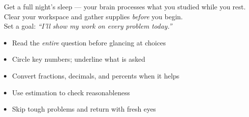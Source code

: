 {\vspace{3mm}

\begin{tcolorbox}[
    enhanced,
    colback=funBlueDark!5,
    colframe=funBlueDark!40,
    arc=8pt, boxrule=1pt,
    left=5mm, right=5mm, top=3mm, bottom=3mm,
    title={\small\faMoon~Pre-Launch Checklist},
    colbacktitle=funBlueDark!15,
    coltitle=black,
    fonttitle=\bfseries\sffamily,
]
    \small
    \textcolor{funBlueDark}{\faCheckCircle}~Get a full night's sleep --- your brain processes what you studied while you rest.\\[2pt]
    \textcolor{funBlueDark}{\faCheckCircle}~Clear your workspace and gather supplies \textit{before} you begin.\\[2pt]
    \textcolor{funBlueDark}{\faCheckCircle}~Set a goal: \textit{``I'll show my work on every problem today.''}
\end{tcolorbox}

\vspace{2mm}

\begin{tcolorbox}[
    enhanced,
    colback=funGreen!6,
    colframe=funGreen!40,
    arc=8pt, boxrule=1pt,
    left=4mm, right=4mm, top=3mm, bottom=3mm,
    title={\faCheckCircle~Green-Light Moves},
    colbacktitle=funGreen!15,
    coltitle=black,
    fonttitle=\bfseries\sffamily,
]
    \small
    \begin{itemize}[leftmargin=*, itemsep=3pt]
        \item Read the \textit{entire} question before glancing at choices
        \item Circle key numbers; underline what is asked
        \item Convert fractions, decimals, and percents when it helps
        \item Use estimation to check reasonableness
        \item Skip tough problems and return with fresh eyes
    \end{itemize}
\end{tcolorbox}

\vspace{2mm}

}

